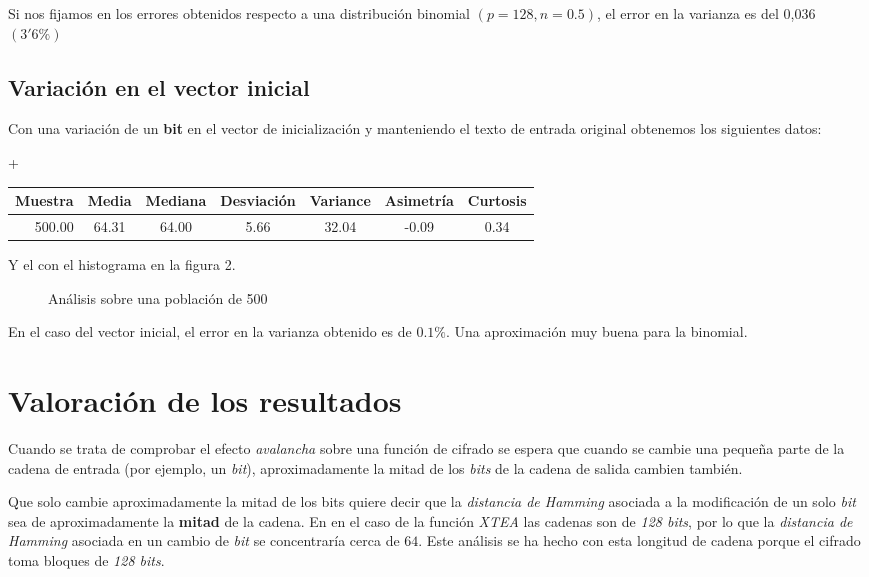 \documentclass[11pt,a4paper]{article}
\begin{document}
Si nos fijamos en los errores obtenidos respecto a una distribución
binomial $(p = 128, n = 0.5)$, el error en la varianza es del 0,036 $(3'6\%)$


\subsection{Variación en el vector inicial}

Con una variación de un \textbf{bit} en el vector de inicialización y manteniendo el texto de entrada original obtenemos los siguientes datos:

+\begin{center}
  \label{tab:vi}
  \begin{tabular}[c]{| r | *{6}{c} |}
  \hline
    Muestra & Media & Mediana & Desviación & Variance & Asimetría & Curtosis \\ \hline
    500.00 &  64.31 &   64.00 &       5.66 &    32.04 &     -0.09 &     0.34 \\
  \hline
  \end{tabular}
\end{center}

Y el con el histograma en la figura 2.

\begin{figure}[H]
  \centering
  \label{fig:vi}
  
  \caption{Análisis sobre una población de 500}
\end{figure}

En el caso del vector inicial, el error en la varianza obtenido es de
$0.1\%$. Una aproximación muy buena para la binomial.

\section{Valoración de los resultados}

Cuando se trata de comprobar el efecto \emph{avalancha} sobre una
función de cifrado se espera que cuando se cambie una pequeña parte
de la cadena de entrada (por ejemplo, un \emph{bit}), aproximadamente
la mitad de los \emph{bits} de la cadena de salida cambien también.

Que solo cambie aproximadamente la mitad de los bits quiere decir que
la \emph{distancia de Hamming} asociada a la modificación de un solo
\emph{bit} sea de aproximadamente la \textbf{mitad} de la cadena. En
en el caso de la función \emph{XTEA} las cadenas son de \emph{128
  bits}, por lo que la \emph{distancia de Hamming} asociada en un
cambio de \emph{bit} se concentraría cerca de $64$. Este análisis se
ha hecho con esta longitud de cadena porque el cifrado toma bloques de
\emph{128 bits}.
\end{document}
